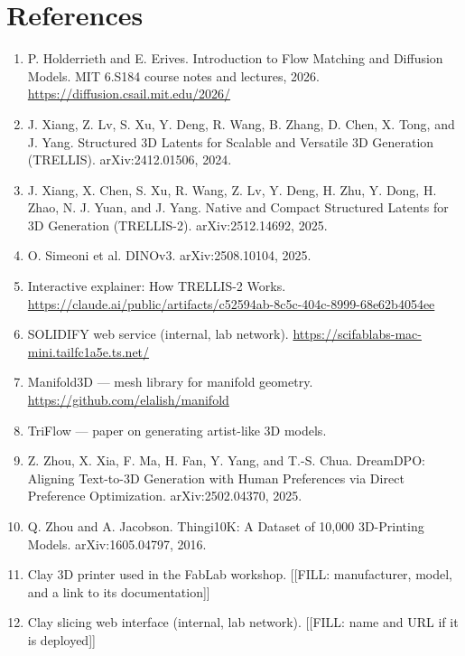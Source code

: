 \documentclass[11pt,a4paper]{article}
\begin{document}
\section*{References}
\begin{enumerate}[leftmargin=*,itemsep=3pt]
  \item P. Holderrieth and E. Erives. Introduction to Flow Matching and Diffusion Models. MIT 6.S184 course notes and lectures, 2026. \url{https://diffusion.csail.mit.edu/2026/}
  \item J. Xiang, Z. Lv, S. Xu, Y. Deng, R. Wang, B. Zhang, D. Chen, X. Tong, and J. Yang. Structured 3D Latents for Scalable and Versatile 3D Generation (TRELLIS). arXiv:2412.01506, 2024.
  \item J. Xiang, X. Chen, S. Xu, R. Wang, Z. Lv, Y. Deng, H. Zhu, Y. Dong, H. Zhao, N. J. Yuan, and J. Yang. Native and Compact Structured Latents for 3D Generation (TRELLIS-2). arXiv:2512.14692, 2025.
  \item O. Simeoni et al. DINOv3. arXiv:2508.10104, 2025.
  \item Interactive explainer: How TRELLIS-2 Works. \url{https://claude.ai/public/artifacts/c52594ab-8c5c-404c-8999-68e62b4054ee}
  \item SOLIDIFY web service (internal, lab network). \url{https://scifablabs-mac-mini.tailfc1a5e.ts.net/}
  \item Manifold3D --- mesh library for manifold geometry. \url{https://github.com/elalish/manifold}
  \item TriFlow --- paper on generating artist-like 3D models.
  \item Z. Zhou, X. Xia, F. Ma, H. Fan, Y. Yang, and T.-S. Chua. DreamDPO: Aligning Text-to-3D Generation with Human Preferences via Direct Preference Optimization. arXiv:2502.04370, 2025.
  \item Q. Zhou and A. Jacobson. Thingi10K: A Dataset of 10,000 3D-Printing Models. arXiv:1605.04797, 2016.
  \item Clay 3D printer used in the FabLab workshop. [[FILL: manufacturer, model, and a link to its documentation]]
  \item Clay slicing web interface (internal, lab network). [[FILL: name and URL if it is deployed]]
\end{enumerate}
\end{document}
